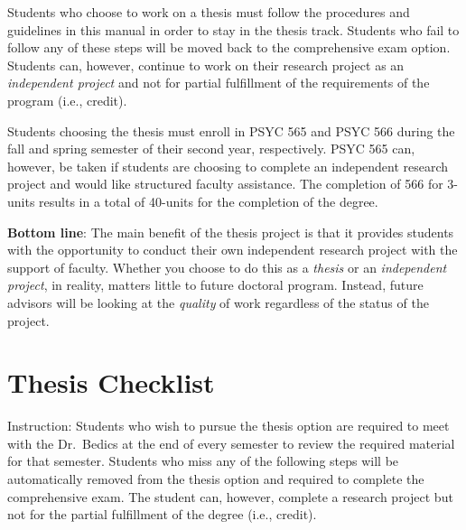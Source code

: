 \documentclass[]{book}
\begin{document}
Students who choose to work on a thesis must follow the procedures and guidelines in this manual in order to stay in the thesis track. Students who fail to follow any of these steps will be moved back to the comprehensive exam option. Students can, however, continue to work on their research project as an \emph{independent project} and not for partial fulfillment of the requirements of the program (i.e., credit).

Students choosing the thesis must enroll in PSYC 565 and PSYC 566 during the fall and spring semester of their second year, respectively. PSYC 565 can, however, be taken if students are choosing to complete an independent research project and would like structured faculty assistance. The completion of 566 for 3-units results in a total of 40-units for the completion of the degree.

\textbf{Bottom line}: The main benefit of the thesis project is that it provides students with the opportunity to conduct their own independent research project with the support of faculty. Whether you choose to do this as a \emph{thesis} or an \emph{independent project}, in reality, matters little to future doctoral program. Instead, future advisors will be looking at the \emph{quality} of work regardless of the status of the project.

\hypertarget{thesis-checklist}{%
\chapter{Thesis Checklist}\label{thesis-checklist}}

Instruction: Students who wish to pursue the thesis option are required to meet with the Dr.~Bedics at the end of every semester to review the required material for that semester. Students who miss any of the following steps will be automatically removed from the thesis option and required to complete the comprehensive exam. The student can, however, complete a research project but not for the partial fulfillment of the degree (i.e., credit).
\end{document}
